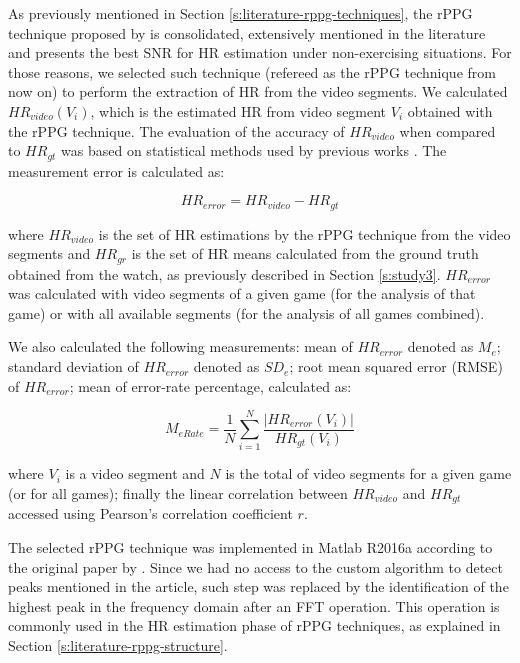 As previously mentioned in Section \ref{s:literature-rppg-techniques}, the rPPG technique proposed by \textcite{poh2011advancements} is consolidated, extensively mentioned in the literature and presents the best SNR for HR estimation under non-exercising situations. For those reasons, we selected such technique (refereed as the rPPG technique from now on) to perform the extraction of HR from the video segments. We calculated $HR_{video}(V_i)$, which is the estimated HR from video segment $V_i$ obtained with the rPPG technique. The evaluation of the accuracy of $HR_{video}$ when compared to $HR_{gt}$ was based on statistical methods used by previous works \parencite{poh2011advancements, rouast2016remote, li2014remote}. The measurement error is calculated as:

\begin{equation}
\label{eqn:hr-error}
HR_{error} = HR_{video} - HR_{gt}
\end{equation}

where $HR_{video}$ is the set of HR estimations by the rPPG technique from the video segments and $HR_{gr}$ is the set of HR means calculated from the ground truth obtained from the watch, as previously described in Section \ref{s:study3}. $HR_{error}$ was calculated with video segments of a given game (for the analysis of that game) or with all available segments (for the analysis of all games combined).

We also calculated the following measurements: mean of $HR_{error}$ denoted as $M_e$; standard deviation of $HR_{error}$ denoted as $SD_e$; root mean squared error (RMSE) of $HR_{error}$; mean of error-rate percentage, calculated as:

\begin{equation}
\label{eqn:merate}
M_{eRate} = \frac{1}{N} \sum_{i=1}^{N}\frac{|HR_{error}(V_i)|}{HR_{gt}(V_i)}
\end{equation}

where $V_i$ is a video segment and $N$ is the total of video segments for a given game (or for all games); finally the linear correlation between $HR_{video}$ and $HR_{gt}$ accessed using Pearson's correlation coefficient $r$.


The selected rPPG technique was implemented in Matlab R2016a according to the original paper by \textcite{poh2011advancements}. Since we had no access to the custom algorithm to detect peaks mentioned in the article, such step was replaced by the identification of the highest peak in the frequency domain after an FFT operation. This operation is commonly used in the HR estimation phase of rPPG techniques, as explained in Section \ref{s:literature-rppg-structure}.

